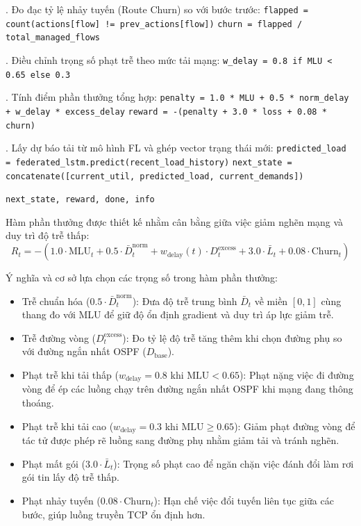 \documentclass[11pt,a4paper]{article}
\begin{document}
\begin{algorithm}[H]
\begin{algorithmic}[1]
. Đo đạc tỷ lệ nhảy tuyến (Route Churn) so với bước trước:
\State \quad \texttt{flapped = count(actions[flow] != prev\_actions[flow])}
\State \quad \texttt{churn = flapped / total\_managed\_flows}

. Điều chỉnh trọng số phạt trễ theo mức tải mạng:
\State \quad \texttt{w\_delay = 0.8 if MLU < 0.65 else 0.3}

. Tính điểm phần thưởng tổng hợp:
\State \quad \texttt{penalty = 1.0 * MLU + 0.5 * norm\_delay + w\_delay * excess\_delay}
\State \quad \texttt{reward = -(penalty + 3.0 * loss + 0.08 * churn)}

. Lấy dự báo tải từ mô hình FL và ghép vector trạng thái mới:
\State \quad \texttt{predicted\_load = federated\_lstm.predict(recent\_load\_history)}
\State \quad \texttt{next\_state = concatenate([current\_util, predicted\_load, current\_demands])}

\State \Return \texttt{next\_state, reward, done, info}
\end{algorithmic}
\end{algorithm}

Hàm phần thưởng được thiết kế nhằm cân bằng giữa việc giảm nghẽn mạng và duy trì độ trễ thấp:
\begin{equation}
\label{eq:reward}
    R_t = -\left( 1.0 \cdot \text{MLU}_t + 0.5 \cdot \bar{D}_t^{\text{norm}} + w_{\text{delay}}(t) \cdot D_t^{\text{excess}} + 3.0 \cdot \bar{L}_t + 0.08 \cdot \text{Churn}_t \right)
\end{equation}

Ý nghĩa và cơ sở lựa chọn các trọng số trong hàm phần thưởng:
\begin{itemize}[leftmargin=1.5em, itemsep=0.15ex]
    \item Trễ chuẩn hóa ($0.5 \cdot \bar{D}_t^{\text{norm}}$): Đưa độ trễ trung bình $\bar{D}_t$ về miền $[0, 1]$ cùng thang đo với MLU để giữ độ ổn định gradient và duy trì áp lực giảm trễ.
    \item Trễ đường vòng ($D_t^{\text{excess}}$): Đo tỷ lệ độ trễ tăng thêm khi chọn đường phụ so với đường ngắn nhất OSPF ($D_{\text{base}}$).
    \item Phạt trễ khi tải thấp ($w_{\text{delay}} = 0.8$ khi $\text{MLU} < 0.65$): Phạt nặng việc đi đường vòng để ép các luồng chạy trên đường ngắn nhất OSPF khi mạng đang thông thoáng.
    \item Phạt trễ khi tải cao ($w_{\text{delay}} = 0.3$ khi $\text{MLU} \ge 0.65$): Giảm phạt đường vòng để tác tử được phép rẽ luồng sang đường phụ nhằm giảm tải và tránh nghẽn.
    \item Phạt mất gói ($3.0 \cdot \bar{L}_t$): Trọng số phạt cao để ngăn chặn việc đánh đổi làm rơi gói tin lấy độ trễ thấp.
    \item Phạt nhảy tuyến ($0.08 \cdot \text{Churn}_t$): Hạn chế việc đổi tuyến liên tục giữa các bước, giúp luồng truyền TCP ổn định hơn.
\end{itemize}
\end{document}
